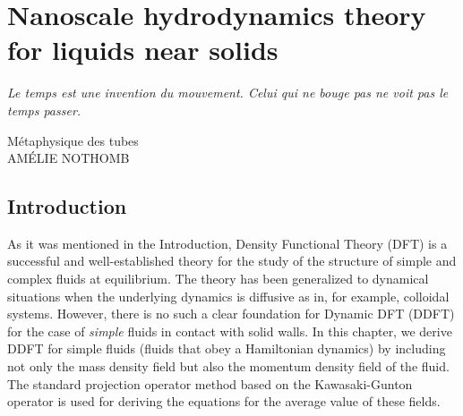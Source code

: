 \documentclass[b5paper,openright,10pt]{book}
\begin{document}
\chapter{Nanoscale hydrodynamics theory for liquids near solids}\label{Chap:Theory}
\epigraph{\textit{Le temps est une invention du mouvement. Celui qui ne bouge pas ne voit pas le temps passer.}}{Métaphysique des tubes \\ AMÉLIE NOTHOMB}


\section{Introduction}
As it was mentioned in the Introduction, Density Functional Theory (DFT) is a successful and well-established theory for the study of the structure of simple and complex fluids at equilibrium. The theory has been generalized to dynamical situations when the underlying dynamics is diffusive as in, for example, colloidal systems. However, there is no such a clear foundation for Dynamic DFT (DDFT) for the case of \textit{simple} fluids in contact with solid walls. 
In this chapter, we derive DDFT for simple fluids (fluids that obey  a Hamiltonian dynamics) by including not only the mass density field but also the momentum density field of the fluid. The standard projection operator method based on the Kawasaki-Gunton operator is used for deriving the equations for the average value of these fields. 
\end{document}
